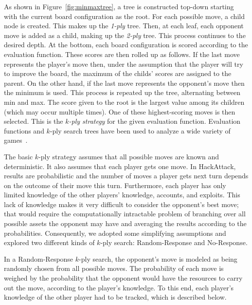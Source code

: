 \documentclass{sig-alternate-05-2015}
\begin{document}
As shown in Figure~\ref{fig:minmaxtree}, a tree is constructed top-down starting with the current board configuration as the root. For each possible move, a child node is created. This makes up the {\em 1-ply} tree. Then, at each leaf, each opponent move is added as a child, making up the {\em 2-ply} tree. This process continues to the desired depth. At the bottom, each board configuration is scored according to the evaluation function. These scores are then rolled up as follows. If the last move represents the player's move then, under the assumption that the player will try to improve the board, the maximum of the childs' scores are assigned to the parent. On the other hand, if the last move represents the opponent's move then the minimum is used. This process is repeated up the tree, alternating between min and max. The score given to the root is the largest value among its children (which may occur multiple times). One of these highest-scoring moves is then selected. This is the {\em $k$-ply strategy} for the given evaluation function. Evaluation functions and $k$-ply search trees have been used to analyze a wide variety of games~\cite{levy2009computer}. 

The basic $k$-ply strategy assumes that all possible moves are known and deterministic. It also assumes that each player gets one move. In HackAttack, results are probabilistic and the number of moves a player gets next turn depends on the outcome of their move this turn. Furthermore, each player has only limited knowledge of the other players' knowledge, accounts, and exploits. This lack of knowledge makes it very difficult to consider the opponent's best move; that would require the computationally intractable problem of branching over all possible assets the opponent may have and averaging the results according to the probabilities. Consequently, we adopted some simplifying assumptions and explored two different kinds of $k$-ply search: Random-Response and No-Response.

In a Random-Response $k$-ply search, the opponent's move is modeled as being randomly chosen from all possible moves. The probability of each move is weighed by the probability that the opponent would have the resources to carry out the move, according to the player's knowledge. To this end, each player's knowledge of the other player had to be tracked, which is described below.
\end{document}
